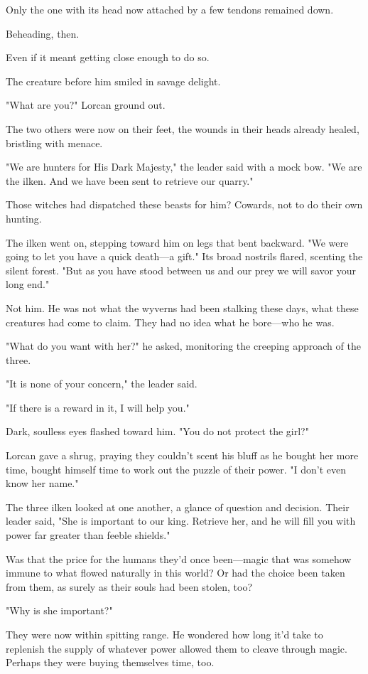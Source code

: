 Only the one with its head now attached by a few tendons remained down.

Beheading, then.

Even if it meant getting close enough to do so.

The creature before him smiled in savage delight.

"What are you?" Lorcan ground out.

The two others were now on their feet, the wounds in their heads already healed, bristling with menace.

"We are hunters for His Dark Majesty," the leader said with a mock bow. "We are the ilken. And we have been sent to retrieve our quarry."

Those witches had dispatched these beasts for him? Cowards, not to do their own hunting.

The ilken went on, stepping toward him on legs that bent backward. "We were going to let you have a quick death---a gift." Its broad nostrils flared, scenting the silent forest. "But as you have stood between us and our prey  we will savor your long end."

Not him. He was not what the wyverns had been stalking these days, what these creatures had come to claim. They had no idea what he bore---who he was.

"What do you want with her?" he asked, monitoring the creeping approach of the three.

"It is none of your concern," the leader said.

"If there is a reward in it, I will help you."

Dark, soulless eyes flashed toward him. "You do not protect the girl?"

Lorcan gave a shrug, praying they couldn't scent his bluff as he bought her more time, bought himself time to work out the puzzle of their power. "I don't even know her name."

The three ilken looked at one another, a glance of question and decision. Their leader said, "She is important to our king. Retrieve her, and he will fill you with power far greater than feeble shields."

Was that the price for the humans they'd once been---magic that was somehow immune to what flowed naturally in this world? Or had the choice been taken from them, as surely as their souls had been stolen, too?

"Why is she important?"

They were now within spitting range. He wondered how long it'd take to replenish the supply of whatever power allowed them to cleave through magic. Perhaps they were buying themselves time, too.

